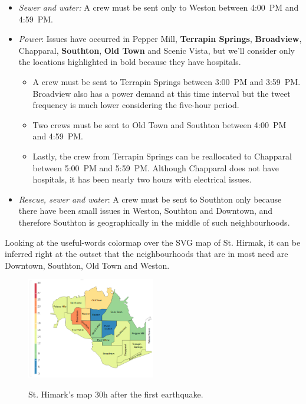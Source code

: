 \begin{itemize}
    \item \emph{Sewer and water:} A crew must be sent only to Weston between 
    4:00~PM and 4:59~PM.
    \smallskip 
    \item \emph{Power}: Issues have occurred in Pepper Mill, \textbf{Terrapin
    Springs}, \textbf{Broadview}, Chapparal, \textbf{Southton}, \textbf{Old 
    Town} and Scenic Vista, but we'll consider only the locations 
    highlighted in bold because they have hospitals.
    \begin{itemize}
        \item A crew must be sent to Terrapin Springs between 3:00~PM and
        3:59~PM. Broadview also has a power demand at this time interval but the
        tweet frequency is much lower considering the five-hour period.
        \item Two crews must be sent to Old Town and Southton between 4:00~PM 
        and 4:59~PM.
        \item Lastly, the crew from Terrapin Springs can be reallocated to
        Chapparal between 5:00~PM and 5:59~PM. Although Chapparal does not have
        hospitals, it has been nearly two hours with electrical issues.
    \end{itemize}
    \item \emph{Rescue, sewer and water}: A crew must be sent to Southton only
    because there have been small issues in Weston, Southton and Downtown, and
    therefore Southton is geographically in the middle of such neighbourhoods.
\end{itemize}

Looking at the useful-words colormap over the SVG map of St. Hirmak, it can be
inferred right at the outset that the neighbourhoods that are in most need are
Downtown, Southton, Old Town and Weston.

\begin{figure}[!h]
    \centering
    \includegraphics[width=0.50\textwidth]{figs/cond_30h/cond_30h_svg.png}
    \label{fig:map_30h}
    \caption{St. Himark's map 30h after the first earthquake.}
\end{figure}

